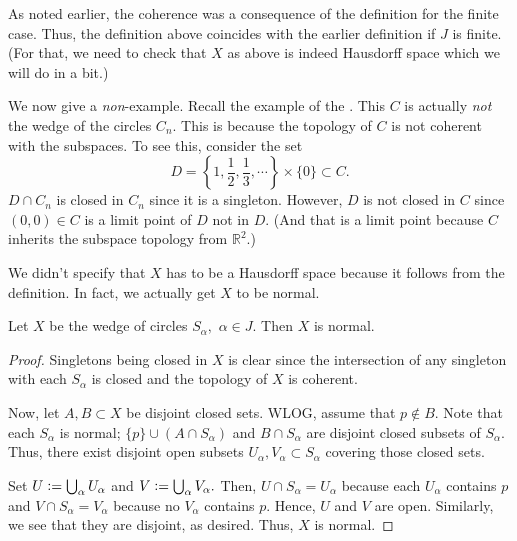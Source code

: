 \documentclass[12pt]{article}
\begin{document}
As noted earlier, the coherence was a consequence of the definition for the finite case. Thus, the definition above coincides with the earlier definition if $J$ is finite. (For that, we need to check that $X$ as above is indeed Hausdorff space which we will do in a bit.)

\begin{ex}
	We now give a \emph{non}-example. Recall the example of the . This $C$ is actually \emph{not} the wedge of the circles $C_n.$ This is because the topology of $C$ is not coherent with the subspaces. To see this, consider the set
	\begin{equation*} 
		D = \left\{1, \dfrac{1}{2}, \dfrac{1}{3}, \cdots\right\}\times\{0\} \subset C.
	\end{equation*}
	$D\cap C_n$ is closed in $C_n$ since it is a singleton. However, $D$ is not closed in $C$ since $(0, 0) \in C$ is a limit point of $D$ not in $D.$ (And that is a limit point because $C$ inherits the subspace topology from $\mathbb{R}^2.$)
\end{ex}

We didn't specify that $X$ has to be a Hausdorff space because it follows from the definition. In fact, we actually get $X$ to be normal.

\begin{prop}
	Let $X$ be the wedge of circles $S_\alpha,$ $\alpha \in J.$ Then $X$ is normal.
\end{prop}
\begin{proof} 
	Singletons being closed in $X$ is clear since the intersection of any singleton with each $S_\alpha$ is closed and the topology of $X$ is coherent.

	Now, let $A, B \subset X$ be disjoint closed sets. WLOG, assume that $p \notin B.$ Note that each $S_\alpha$ is normal; $\{p\}\cup(A \cap S_\alpha)$ and $B \cap S_\alpha$ are disjoint closed subsets of $S_\alpha.$ Thus, there exist disjoint open subsets $U_\alpha, V_\alpha \subset S_\alpha$ covering those closed sets.

	Set $U \vcentcolon= \bigcup_{\alpha} U_\alpha$ and $V \vcentcolon= \bigcup_{\alpha} V_\alpha.$ Then, $U \cap S_\alpha = U_\alpha$ because each $U_\alpha$ contains $p$ and $V \cap S_\alpha = V_\alpha$ because no $V_\alpha$ contains $p.$ Hence, $U$ and $V$ are open. Similarly, we see that they are disjoint, as desired. Thus, $X$ is normal.
\end{proof}
\end{document}

